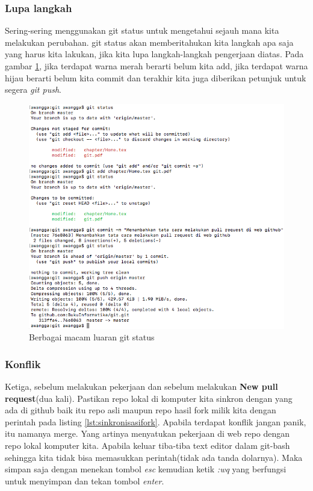 \subsubsection{Lupa langkah}
Sering-sering menggunakan git status untuk mengetahui sejauh mana kita melakukan perubahan. git status akan memberitahukan kita langkah apa saja yang harus kita lakukan, jika kita lupa langkah-langkah pengerjaan diatas. Pada gambar \ref{gitstatus}, jika terdapat warna merah berarti belum kita add, jika terdapat warna hijau berarti belum kita commit dan terakhir kita juga diberikan petunjuk untuk segera \textit{git push}.
\begin{figure}[!htbp]
\centerline{\includegraphics[width=.75\textwidth]{Figures/gitstatus}}
\caption{Berbagai macam luaran git status}
\label{gitstatus}
\end{figure}

\subsubsection{Konflik}
Ketiga, sebelum melakukan pekerjaan dan sebelum melakukan \textbf{New pull request}(dua kali). Pastikan repo lokal di komputer kita sinkron dengan yang ada di github baik itu repo asli maupun repo hasil fork milik kita dengan perintah pada listing \ref{lst:sinkronisasifork}. Apabila terdapat konflik jangan panik, itu namanya merge. Yang artinya menyatukan pekerjaan di web repo dengan repo lokal komputer kita. Apabila keluar tiba-tiba text editor dalam git-bash sehingga kita tidak bisa memasukkan perintah(tidak ada tanda dolarnya). Maka simpan saja dengan menekan tombol \textit{esc} kemudian ketik \textit{:wq} yang berfungsi untuk menyimpan dan tekan tombol \textit{enter}.
